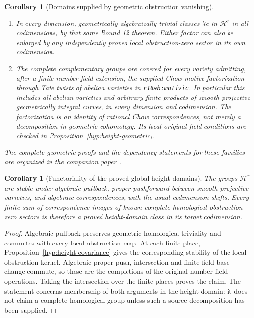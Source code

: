\documentclass[11pt,a4paper]{article}
\newtheorem{corollary}[theorem]{Corollary}
\theoremstyle{definition}
\theoremstyle{remark}
\numberwithin{equation}{section}
\begin{document}
\begin{corollary}[Domains supplied by geometric obstruction vanishing]
\begin{enumerate}
      $\operatorname{CH}^3_{\mathbf Q,\rm hom}\times
       \operatorname{CH}^3_{\mathbf Q,\rm hom}\to\mathbf R$.
      More generally, the same full conclusion holds for targets
      of the rational domination of dimension-at-most-five sources
      satisfying the original-field full-kernel hypothesis of
      \texttt{r16cov:rational-low-dimension}. In higher dimensions,
      one applies \texttt{r16cov:rational-outer} separately to
      both complementary codimensions; a theorem for one factor
      alone does not supply the other factor.
\item In every dimension, geometrically algebraically trivial classes
      lie in $\mathcal H^r$ in all codimensions, by that same Round 12
      theorem. Either factor can also be enlarged by any independently
      proved local obstruction-zero sector in its own codimension.
\item The complete complementary groups are covered for every
      variety admitting, after a finite number-field extension, the
      supplied Chow-motive factorization through Tate twists of
      abelian varieties in \texttt{r16ab:motivic}. In particular this
      includes all abelian varieties and arbitrary finite products
      of smooth projective geometrically integral curves, in every
      dimension and codimension. The factorization is an identity
      of rational Chow correspondences, not merely a decomposition
      in geometric cohomology. Its local original-field conditions
      are checked in Proposition~\ref{hyp:height-geometric}.
\end{enumerate}
The complete geometric proofs and the dependency statements for these families are organized in the companion paper \cite{SC}.
\end{corollary}

\begin{corollary}[Functoriality of the proved global height domains]
\label{r16h:domain-functoriality}
The groups $\mathcal H^r$ are stable under algebraic pullback,
proper pushforward between smooth projective varieties, and
algebraic correspondences, with the usual codimension shifts.
Every finite sum of correspondence images of known complete
homological obstruction-zero sectors is therefore a proved
height-domain class in its target codimension.
\end{corollary}

\begin{proof}
Algebraic pullback preserves geometric homological triviality and
commutes with every local obstruction map. At each finite place,
Proposition~\ref{hyp:height-covariance} gives the corresponding stability
of the local obstruction kernel. Algebraic proper push,
intersection and finite field base change commute, so these are
the completions of the original number-field operations.
Taking the intersection over the finite places proves the claim.
The statement concerns membership of both arguments in the
height domain; it does not claim a complete homological group
unless such a source decomposition has been supplied.
\end{proof}
\end{document}

